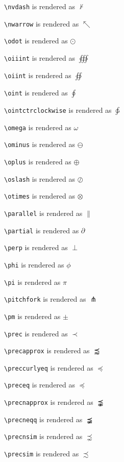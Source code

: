\texttt{\textbackslash nvdash} is rendered as $\nvdash$

\texttt{\textbackslash nwarrow} is rendered as $\nwarrow$

\texttt{\textbackslash odot} is rendered as $\odot$

\texttt{\textbackslash oiiint} is rendered as $\oiiint$

\texttt{\textbackslash oiint} is rendered as $\oiint$

\texttt{\textbackslash oint} is rendered as $\oint$

\texttt{\textbackslash ointctrclockwise} is rendered as $\ointctrclockwise$

\texttt{\textbackslash omega} is rendered as $\omega$

\texttt{\textbackslash ominus} is rendered as $\ominus$

\texttt{\textbackslash oplus} is rendered as $\oplus$

\texttt{\textbackslash oslash} is rendered as $\oslash$

\texttt{\textbackslash otimes} is rendered as $\otimes$

\texttt{\textbackslash parallel} is rendered as $\parallel$

\texttt{\textbackslash partial} is rendered as $\partial$

\texttt{\textbackslash perp} is rendered as $\perp$

\texttt{\textbackslash phi} is rendered as $\phi$

\texttt{\textbackslash pi} is rendered as $\pi$

\texttt{\textbackslash pitchfork} is rendered as $\pitchfork$

\texttt{\textbackslash pm} is rendered as $\pm$

\texttt{\textbackslash prec} is rendered as $\prec$

\texttt{\textbackslash precapprox} is rendered as $\precapprox$

\texttt{\textbackslash preccurlyeq} is rendered as $\preccurlyeq$

\texttt{\textbackslash preceq} is rendered as $\preceq$

\texttt{\textbackslash precnapprox} is rendered as $\precnapprox$

\texttt{\textbackslash precneqq} is rendered as $\precneqq$

\texttt{\textbackslash precnsim} is rendered as $\precnsim$

\texttt{\textbackslash precsim} is rendered as $\precsim$

